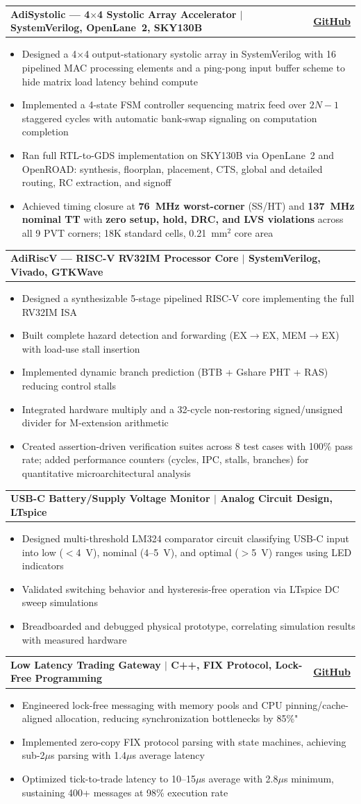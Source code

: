 \documentclass[letterpaper,11pt]{article}
\makeatletter
\newcommand{\resumeItem}[1]{
  \item\small{
    {#1 \vspace{-2pt}}
  }
}
\newcommand{\resumeProjectHeading}[2]{
    \item
    \begin{tabular*}{0.97\textwidth}{l@{\extracolsep{\fill}}r}
      \textbf{\small#1} & \textbf{\small #2} \\
    \end{tabular*}\vspace{-7pt}
}
\newcommand{\resumeItemListStart}{\begin{itemize}[leftmargin=0.0in]}
\newcommand{\resumeItemListEnd}{\end{itemize}\vspace{-5pt}}
\makeatother
\begin{document}
  \resumeProjectHeading
    {AdiSystolic --- 4$\times$4 Systolic Array Accelerator $|$ SystemVerilog, OpenLane~2, SKY130B}{{\href{https://github.com/Aditya-1020/AdiSystolic}{GitHub}}}
  \resumeItemListStart
    \resumeItem{Designed a 4$\times$4 output-stationary systolic array in SystemVerilog with 16 pipelined MAC processing elements and a ping-pong input buffer scheme to hide matrix load latency behind compute}
    \resumeItem{Implemented a 4-state FSM controller sequencing matrix feed over $2N{-}1$ staggered cycles with automatic bank-swap signaling on computation completion}
    \resumeItem{Ran full RTL-to-GDS implementation on SKY130B via OpenLane~2 and OpenROAD: synthesis, floorplan, placement, CTS, global and detailed routing, RC extraction, and signoff}
    \resumeItem{Achieved timing closure at \textbf{76~MHz worst-corner} (SS/HT) and \textbf{137~MHz nominal TT} with \textbf{zero setup, hold, DRC, and LVS violations} across all 9 PVT corners; 18K standard cells, 0.21~mm$^2$ core area}
  \resumeItemListEnd

  \resumeProjectHeading
    {AdiRiscV --- RISC-V RV32IM Processor Core $|$ SystemVerilog, Vivado, GTKWave}{}
  \resumeItemListStart
    \resumeItem{Designed a synthesizable 5-stage pipelined RISC-V core implementing the full RV32IM ISA}
    \resumeItem{Built complete hazard detection and forwarding (EX$\rightarrow$EX, MEM$\rightarrow$EX) with load-use stall insertion}
    \resumeItem{Implemented dynamic branch prediction (BTB + Gshare PHT + RAS) reducing control stalls}
    \resumeItem{Integrated hardware multiply and a 32-cycle non-restoring signed/unsigned divider for M-extension arithmetic}
    \resumeItem{Created assertion-driven verification suites across 8 test cases with 100\% pass rate; added performance counters (cycles, IPC, stalls, branches) for quantitative microarchitectural analysis}
  \resumeItemListEnd

  \resumeProjectHeading
    {USB-C Battery/Supply Voltage Monitor $|$ Analog Circuit Design, LTspice}{}
  \resumeItemListStart
    \resumeItem{Designed multi-threshold LM324 comparator circuit classifying USB-C input into low ($<$4~V), nominal (4--5~V), and optimal ($>$5~V) ranges using LED indicators}
    \resumeItem{Validated switching behavior and hysteresis-free operation via LTspice DC sweep simulations}
    \resumeItem{Breadboarded and debugged physical prototype, correlating simulation results with measured hardware}
  \resumeItemListEnd

  \resumeProjectHeading
    {Low Latency Trading Gateway $|$ C++, FIX Protocol, Lock-Free Programming}{\href{https://github.com/Aditya-1020/tik}{GitHub}}
  \resumeItemListStart
    \resumeItem{Engineered lock-free messaging with memory pools and CPU pinning/cache-aligned allocation, reducing synchronization bottlenecks by 85\%"}
    \resumeItem{Implemented zero-copy FIX protocol parsing with state machines, achieving sub-2$\mu$s parsing with 1.4$\mu$s average latency}
    \resumeItem{Optimized tick-to-trade latency to 10--15$\mu$s average with 2.8$\mu$s minimum, sustaining 400+ messages at 98\% execution rate}
  \resumeItemListEnd
\end{document}
